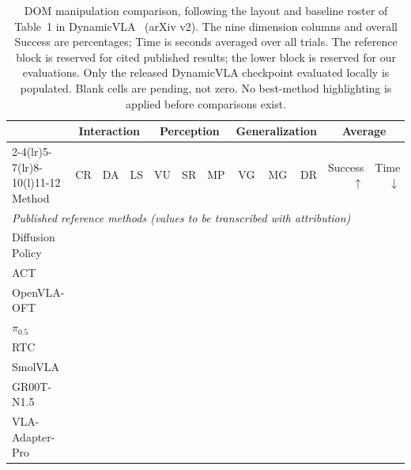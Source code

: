 \documentclass[10pt,twocolumn,letterpaper]{article}
\newcommand{\pending}{\phantom{00.00}}
\begin{document}
\begin{table}[t]
\centering
\caption{DOM manipulation comparison, following the layout and baseline roster
of Table~1 in DynamicVLA~\citep{xie2026dynamicvla} (arXiv v2).
The nine dimension columns and overall Success are percentages; Time is seconds
averaged over all trials. The reference block is reserved for cited published
results; the lower block is reserved for our evaluations. Only the released
DynamicVLA checkpoint evaluated locally is populated. Blank cells are pending,
not zero. No best-method highlighting is applied before comparisons exist.}
\label{tab:dom_main}
\begingroup
\setlength{\tabcolsep}{3pt}
\renewcommand{\arraystretch}{1.08}
\scriptsize
\begin{tabular*}{\textwidth}{@{\extracolsep{\fill}}l*{11}{r}@{}}
\toprule
& \multicolumn{3}{c}{Interaction} & \multicolumn{3}{c}{Perception}
& \multicolumn{3}{c}{Generalization} & \multicolumn{2}{c}{Average} \\
\cmidrule(lr){2-4}\cmidrule(lr){5-7}\cmidrule(lr){8-10}\cmidrule(l){11-12}
Method & CR & DA & LS & VU & SR & MP & VG & MG & DR
& Success $\uparrow$ & Time $\downarrow$ \\
\midrule
\multicolumn{12}{l}{\textit{Published reference methods (values to be transcribed with attribution)}} \\
Diffusion Policy & \pending & \pending & \pending & \pending & \pending & \pending & \pending & \pending & \pending & \pending & \pending \\
ACT & \pending & \pending & \pending & \pending & \pending & \pending & \pending & \pending & \pending & \pending & \pending \\
OpenVLA-OFT & \pending & \pending & \pending & \pending & \pending & \pending & \pending & \pending & \pending & \pending & \pending \\
$\pi_{0.5}$ & \pending & \pending & \pending & \pending & \pending & \pending & \pending & \pending & \pending & \pending & \pending \\
RTC & \pending & \pending & \pending & \pending & \pending & \pending & \pending & \pending & \pending & \pending & \pending \\
SmolVLA & \pending & \pending & \pending & \pending & \pending & \pending & \pending & \pending & \pending & \pending & \pending \\
GR00T-N1.5 & \pending & \pending & \pending & \pending & \pending & \pending & \pending & \pending & \pending & \pending & \pending \\
VLA-Adapter-Pro & \pending & \pending & \pending & \pending & \pending & \pending & \pending & \pending & \pending & \pending & \pending \\

\end{tabular*}
\end{table}
\end{document}
